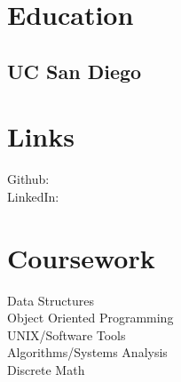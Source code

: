 \documentclass[]{deedy-resume-openfont}
\begin{document}
%
%

%
%



%
%

\begin{minipage}[t]{0.33\textwidth} 


\section{Education} 

\subsection{UC San Diego}
\sectionsep



\sectionsep


\section{Links} 
Github: \href{https://github.com/arvindsaripalli}{} \\
LinkedIn:  \href{https://www.linkedin.com/in/arvindsaripalli/}{} \\
\sectionsep


\section{Coursework}
Data Structures \\
Object Oriented Programming \\
UNIX/Software Tools \\
Algorithms/Systems Analysis \\
Discrete Math \\
\sectionsep


\end{minipage}
\end{document}
